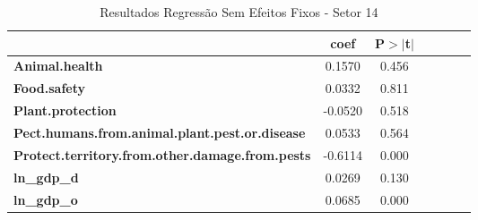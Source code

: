 \begin{table}[ht]
    \begin{center}
        \begin{tabular}{lcccccc}
            & \textbf{coef} & \textbf{P$> |$t$|$} \\
            \midrule
\textbf{Animal.health}                                    &       0.1570  &         0.456  \\
\textbf{Food.safety}                                      &       0.0332  &         0.811  \\
\textbf{Plant.protection}                                 &      -0.0520  &         0.518  \\
\textbf{Pect.humans.from.animal.plant.pest.or.disease}    &       0.0533  &         0.564  \\
\textbf{Protect.territory.from.other.damage.from.pests}   &      -0.6114  &         0.000  \\
\textbf{ln\_gdp\_d}                                       &       0.0269  &         0.130  \\
\textbf{ln\_gdp\_o}                                       &       0.0685  &         0.000  \\
\bottomrule
\end{tabular}
\caption{Resultados Regressão Sem Efeitos Fixos - Setor 14}
\end{center}
\end{table}